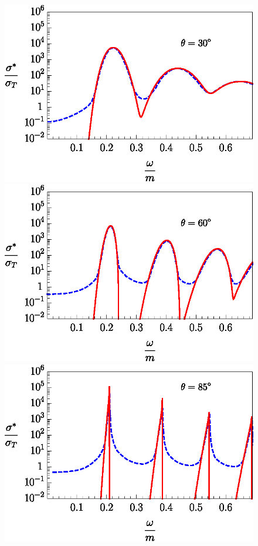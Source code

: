 \documentclass[cp1251%
               ]{jetp} %
\begin{document}
\begin{figure}[t!]\centering
\includegraphics[width=1\linewidth,clip]{fig1_1.eps}
\includegraphics[width=1\linewidth,clip]{fig1_2.eps}
\includegraphics[width=1\linewidth,clip]{fig1_3.eps}

\end{figure}
\end{document}
